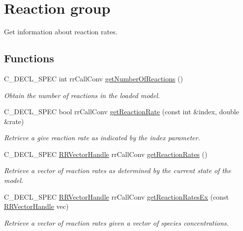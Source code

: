 \hypertarget{group__reaction}{
\section{\-Reaction group}
\label{group__reaction}
}


\-Get information about reaction rates.  


\subsection*{\-Functions}
\begin{DoxyCompactItemize}
\item 
\-C\-\_\-\-D\-E\-C\-L\-\_\-\-S\-P\-E\-C int rr\-Call\-Conv \hyperlink{group__reaction_gae25399f84ff2d1fda619358a1af9a1b5}{get\-Number\-Of\-Reactions} ()
\begin{DoxyCompactList}\small\item\em \-Obtain the number of reactions in the loaded model. \end{DoxyCompactList}\item 
\-C\-\_\-\-D\-E\-C\-L\-\_\-\-S\-P\-E\-C bool rr\-Call\-Conv \hyperlink{group__reaction_gaa2ec2c989a20e15b0fb5cb45b3af2837}{get\-Reaction\-Rate} (const int \&index, double \&rate)
\begin{DoxyCompactList}\small\item\em \-Retrieve a give reaction rate as indicated by the index parameter. \end{DoxyCompactList}\item 
\-C\-\_\-\-D\-E\-C\-L\-\_\-\-S\-P\-E\-C \hyperlink{rr__c__types_8h_aea46a16752b0ae2cd95c009030ee630e}{\-R\-R\-Vector\-Handle} \*
rr\-Call\-Conv \hyperlink{group__reaction_ga86d544bcf3eeaa4698a60123a3da69aa}{get\-Reaction\-Rates} ()
\begin{DoxyCompactList}\small\item\em \-Retrieve a vector of reaction rates as determined by the current state of the model. \end{DoxyCompactList}\item 
\-C\-\_\-\-D\-E\-C\-L\-\_\-\-S\-P\-E\-C \hyperlink{rr__c__types_8h_aea46a16752b0ae2cd95c009030ee630e}{\-R\-R\-Vector\-Handle} \*
rr\-Call\-Conv \hyperlink{group__reaction_gaa03d9414ddeb177a76365dd5b2d0042e}{get\-Reaction\-Rates\-Ex} (const \hyperlink{rr__c__types_8h_aea46a16752b0ae2cd95c009030ee630e}{\-R\-R\-Vector\-Handle} vec)
\begin{DoxyCompactList}\small\item\em \-Retrieve a vector of reaction rates given a vector of species concentrations. \end{DoxyCompactList}\item 

\end{DoxyCompactItemize}
